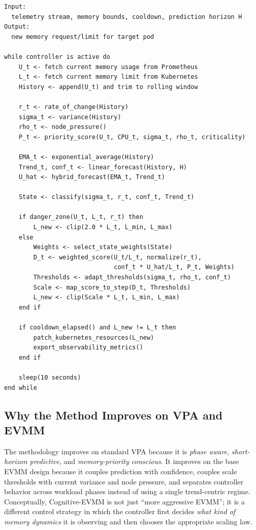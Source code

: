 \documentclass[12pt,a4paper]{article}
\begin{document}
\begin{lstlisting}[caption={Pseudo-code for the proposed Cognitive-EVMM controller.},label={lst:cognitive_evmm}]
Input:
  telemetry stream, memory bounds, cooldown, prediction horizon H
Output:
  new memory request/limit for target pod

while controller is active do
    U_t <- fetch current memory usage from Prometheus
    L_t <- fetch current memory limit from Kubernetes
    History <- append(U_t) and trim to rolling window

    r_t <- rate_of_change(History)
    sigma_t <- variance(History)
    rho_t <- node_pressure()
    P_t <- priority_score(U_t, CPU_t, sigma_t, rho_t, criticality)

    EMA_t <- exponential_average(History)
    Trend_t, conf_t <- linear_forecast(History, H)
    U_hat <- hybrid_forecast(EMA_t, Trend_t)

    State <- classify(sigma_t, r_t, conf_t, Trend_t)

    if danger_zone(U_t, L_t, r_t) then
        L_new <- clip(2.0 * L_t, L_min, L_max)
    else
        Weights <- select_state_weights(State)
        D_t <- weighted_score(U_t/L_t, normalize(r_t),
                              conf_t * U_hat/L_t, P_t, Weights)
        Thresholds <- adapt_thresholds(sigma_t, rho_t, conf_t)
        Scale <- map_score_to_step(D_t, Thresholds)
        L_new <- clip(Scale * L_t, L_min, L_max)
    end if

    if cooldown_elapsed() and L_new != L_t then
        patch_kubernetes_resources(L_new)
        export_observability_metrics()
    end if

    sleep(10 seconds)
end while
\end{lstlisting}

\subsection{Why the Method Improves on VPA and EVMM}

The methodology improves on standard VPA because it is \emph{phase aware}, \emph{short-horizon predictive}, and \emph{memory-priority conscious}. It improves on the base EVMM design because it couples prediction with confidence, couples scale thresholds with current variance and node pressure, and separates controller behavior across workload phases instead of using a single trend-centric regime. Conceptually, Cognitive-EVMM is not just ``more aggressive EVMM''; it is a different control strategy in which the controller first decides \emph{what kind of memory dynamics} it is observing and then chooses the appropriate scaling law.
\end{document}
